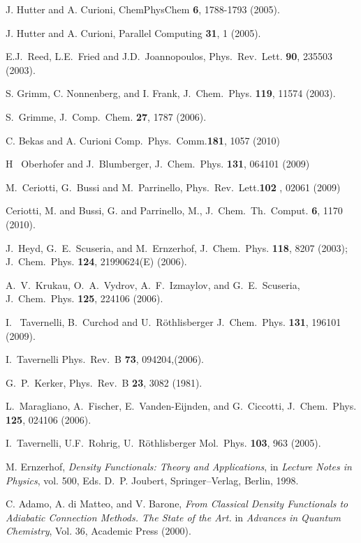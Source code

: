 \documentclass[twoside,10pt,titlepage,a4paper]{article}
\begin{document}
\begin{thebibliography}{999}
 J. Hutter and A. Curioni,
     ChemPhysChem {\bf 6}, 1788-1793 (2005).

 J. Hutter and A. Curioni,
     Parallel Computing {\bf 31}, 1 (2005).

    E.J.~Reed, L.E.~Fried and J.D.~Joannopoulos,
    Phys.~Rev.~Lett. {\bf 90}, 235503 (2003).

    S. Grimm, C. Nonnenberg, and I. Frank, J.~Chem.~Phys. {\bf 119}, 11574 (2003).

    S.~Grimme, J.~Comp.~Chem. {\bf 27}, 1787 (2006).

C. Bekas and A. Curioni
Comp.~Phys.~Comm.{\bf 181}, 1057 (2010)

H ~Oberhofer and J.~Blumberger,
J.~Chem.~Phys. {\bf 131}, 064101 (2009)

M.~Ceriotti, G.~Bussi and M.~Parrinello,
Phys.~Rev.~Lett.{\bf 102} , 02061 (2009)

    Ceriotti, M. and Bussi, G. and Parrinello, M.,
    J.~Chem.~Th.~Comput. {\bf 6}, 1170 (2010).

J.~Heyd, G.~E.~Scuseria, and M.~Ernzerhof,
J.~Chem.~Phys. {\bf 118}, 8207 (2003);
J.~Chem.~Phys. {\bf 124}, 21990624(E) (2006).

A.~V.~Krukau, O.~A.~Vydrov, A.~F.~Izmaylov, and G.~E.~Scuseria,
J.~Chem.~Phys. {\bf 125}, 224106 (2006).

I. ~Tavernelli, B.~Curchod and U.~R\"othlisberger
J.~Chem.~Phys. {\bf 131}, 196101 (2009).

I.~Tavernelli
Phys.~Rev.~B  {\bf 73}, 094204,(2006).

    G.~P.~Kerker, Phys.~Rev.~B {\bf 23}, 3082 (1981).

    L.~Maragliano, A.~Fischer, E.~Vanden-Eijnden, and G.~Ciccotti, 
    J.~Chem.~Phys. {\bf 125}, 024106 (2006).

    I.~Tavernelli, U.F.~Rohrig, U.~R\"othlisberger
    Mol.~Phys. {\bf 103}, 963 (2005).

    M. Ernzerhof, {\it Density Functionals: Theory and Applications},
    in {\em Lecture Notes in Physics}, vol. 500, Eds. D.~P. Joubert,
    Springer--Verlag, Berlin, 1998.

    C. Adamo, A. di Matteo, and V. Barone, {\it From Classical Density
    Functionals to Adiabatic Connection Methods. The State of the
    Art.} in {\em Advances in Quantum Chemistry}, Vol. 36, Academic Press
    (2000).


\end{thebibliography}
\end{document}
